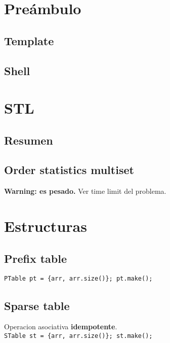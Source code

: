 

\def\title{Notebook (largo)}
\tableofcontents\newpage


\section{Preámbulo}
    \subsection{Template}
    \subsection{Shell}
        

\section{STL}
    \subsection{Resumen}
        
    \subsection{Order statistics multiset}
        \textbf{Warning: es pesado.} Ver time limit del problema.

\section{Estructuras}
    \subsection{Prefix table}
        \texttt{PTable pt = \{arr, arr.size()\}; pt.make();}

    \subsection{Sparse table}
        Operacion asociativa \textbf{idempotente}. \\
        \texttt{STable st = \{arr, arr.size()\}; st.make();}

